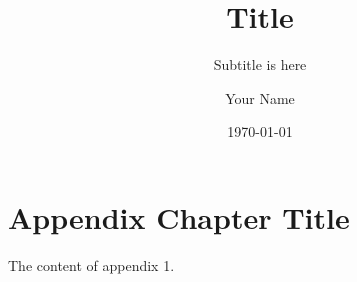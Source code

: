 \documentclass{elegantbook}
\title{Title}
\subtitle{Subtitle is here}
\author{Your Name}
\institute{XXX University}
\date{\today}
\begin{document}
\maketitle
\tableofcontents
\mainmatter
\hypersetup{pageanchor=true}




\appendix

\chapter{Appendix Chapter Title}
The content of appendix 1.
\end{document}
